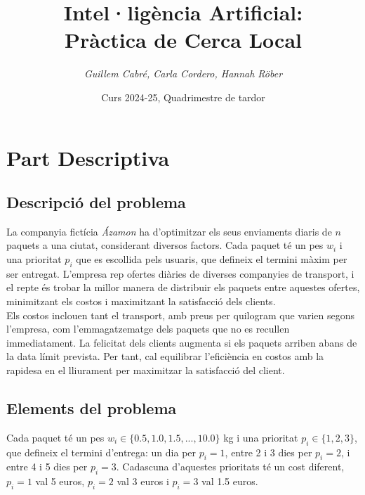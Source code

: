 \documentclass[a4paper]{article}
\title{\textbf{Intel·ligència Artificial:\\
		Pràctica de Cerca Local}}
\author{\emph{Guillem Cabré, Carla Cordero, Hannah Röber}}
\date{Curs 2024-25, Quadrimestre de tardor}
\begin{document}
	
	\begin{titlepage}
		\clearpage\maketitle
		\thispagestyle{empty}
	\end{titlepage}
	
	\tableofcontents
	\clearpage
	
	\section{Part Descriptiva}
	
	\subsection{Descripció del problema}
	
	La companyia fictícia \textit{Ázamon} ha d'optimitzar els seus enviaments diaris de $n$ paquets a una ciutat, considerant diversos factors. Cada paquet té un pes $w_i$ i una prioritat $p_i$ que es escollida pels usuaris, que defineix el termini màxim per ser entregat. L'empresa rep ofertes diàries de diverses companyies de transport, i el repte és trobar la millor manera de distribuir els paquets entre aquestes ofertes, minimitzant els costos i maximitzant la satisfacció dels clients. \\
	
	Els costos inclouen tant el transport, amb preus per quilogram que varien segons l'empresa, com l'emmagatzematge dels paquets que no es recullen immediatament. La felicitat dels clients augmenta si els paquets arriben abans de la data límit prevista. Per tant, cal equilibrar l'eficiència en costos amb la rapidesa en el lliurament per maximitzar la satisfacció del client. \\
	
	\subsection{Elements del problema}
	
	Cada paquet té un pes $w_i \in \{0.5, 1.0, 1.5, ..., 10.0\}$ kg i una prioritat $p_i \in \{1, 2, 3\}$, que defineix el termini d'entrega: un dia per $p_i = 1$, entre 2 i 3 dies per $p_i = 2$, i entre 4 i 5 dies per $p_i = 3$. Cadascuna d'aquestes prioritats té un cost diferent, $p_i = 1$ val 5 euros, $p_i = 2$ val 3 euros i $p_i = 3$ val 1.5 euros. \\
	
\end{document}
